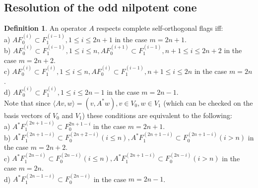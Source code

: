\documentclass[12pt]{amsart}
\theoremstyle{definition}
\newtheorem{defn}[thm]{Definition}
\theoremstyle{remark}
\numberwithin{equation}{subsection}
\begin{document}
\subsection{Resolution of the odd nilpotent cone}
\begin{defn}
  \label{defn1}
  An operator $A$ respects complete self-orthogonal flags iff:\\
a) $AF_0^{(i)}\subset F_1^{(i-1)}, 1\le i\le 2n+1$ in the case $m=2n+1$.\\
b) $AF_0^{(i)}\subset F_1^{(i-1)}, 1\le i\le n, AF_0^{(i+1)}\subset F_1^{(i-1)},n+1\le i\le 2n+2$ in the case $m=2n+2$.\\
c) $AF_0^{(i)}\subset F_1^{(i)}, 1\le i\le n, AF_0^{(i)}\subset F_1^{(i-1)},n+1\le i\le 2n$ in the case $m=2n$.\\
d) $AF_0^{(i)}\subset F_1^{(i)}, 1\le i\le 2n-1$ in the case $m=2n-1$.\\
Note that since $\langle Av,w \rangle=(v,A^* w), v\in V_0, w\in V_1$ (which can be checked on the basis vectors of $V_0$ and $V_1$) these conditions are equivalent to the following:\\
a) $A^* F_1^{(2n+1-i)} \subset F_0^{2n+1-i}$ in the case $m=2n+1$.\\
b) $A^*F_1^{(2n+1-i)}\subset F_0^{(2n+2-i)} (i\le n), A^*F_1^{(2n+1-i)}\subset F_0^{(2n+1-i)} (i>n)$ in the case $m=2n+2$.\\
c) $A^*F_1^{(2n-i)}\subset F_0^{(2n-i)} (i\le n),A^* F_1^{(2n+1-i)}\subset F_0^{(2n-i)} (i>n)$ in the case $m=2n$.\\
d) $A^*F_1^{(2n-1-i)}\subset F_0^{(2n-i)}$ in the case $m=2n-1$.
\end{defn}
\end{document}

